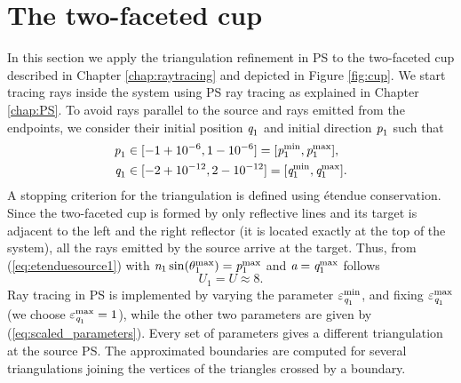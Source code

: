 \section{The two-faceted cup}
In this section we apply the triangulation refinement in PS to the two-faceted cup described in Chapter \ref{chap:raytracing} and depicted in Figure \ref{fig:cup}. 
We start tracing rays inside the system using PS ray tracing as explained in Chapter \ref{chap:PS}. To avoid rays parallel to the source and rays emitted from the endpoints, we consider their initial position $\textit{q}_1$ and initial direction $\textit{p}_1$ such that 
\begin{equation*}
\begin{aligned}
\textit{p}_1&\in[-1+10^{-6},1-10^{-6}] = [\textit{p}_1^{\textrm{min}}, \textit{p}_1^{\textrm{max}}], \\ 
\textit{q}_1&\in[-2+10^{-12}, 2-10^{-12}] = [\textit{q}_1^{\textrm{min}}, \textit{q}_1^{\textrm{max}}].
\end{aligned}
\end{equation*} 
A stopping criterion for the triangulation is defined using \'{e}tendue conservation. Since the two-faceted cup is formed by only reflective lines and its target is adjacent to the left and the right reflector (it is located exactly at the top of the system),  all the rays emitted by the source arrive at the target. Thus, from (\ref{eq:etenduesource1}) with $\textit{n}_1\sin(\theta_1^{\textrm{max}})=\textit{p}_1^\textrm{max}$ and $\textit{a}=\textit{q}_1^{\textrm{max}}$ follows
\begin{equation}U_1 = U \approx 8. \end{equation}
Ray tracing in PS is implemented by varying the parameter $\varepsilon_{\textit{q}_1}^{\textrm{min}}$, and fixing  $\varepsilon_{\textit{q}_1}^{\textrm{max}}$ (we choose $\varepsilon_{\textit{q}_1}^{\textrm{max}}=1$), while the other two parameters are given by (\ref{eq:scaled_parameters}).
Every set of parameters gives a different triangulation at the source PS. The approximated boundaries are computed for several triangulations joining the vertices of the triangles crossed by a boundary. 
